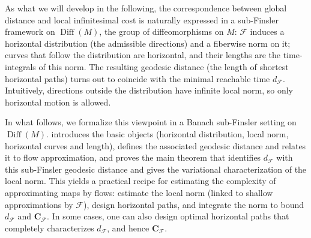 \documentclass[12pt]{amsart}
\numberwithin{equation}{section}
\theoremstyle{remark}
\newcommand{\ql}[1]{\texttt{\color{cyan} QL: \footnotesize #1}}
\begin{document}
As what we will develop in the following,
the correspondence between global distance and local infinitesimal cost is naturally expressed
in a sub-Finsler framework on $\operatorname{Diff}(M)$, the group of diffeomorphisms on $M$:
$\mathcal F$ induces a horizontal distribution (the admissible directions) and a fiberwise norm on it;
curves that follow the distribution are horizontal, and their lengths are the time-integrals of this norm.
The resulting geodesic distance (the length of shortest horizontal paths)
turns out to coincide with the minimal reachable time $d_{\mathcal F}$.
Intuitively, directions outside the distribution have infinite local norm,
so only horizontal motion is allowed.

In what follows, we formalize this viewpoint in a Banach sub-Finsler setting on $\operatorname{Diff}(M)$.
 introduces the basic objects (horizontal distribution, local norm, horizontal curves and length),
 defines the associated geodesic distance and relates it to flow approximation,
and  proves the main theorem that identifies $d_{\mathcal F}$ with this sub-Finsler geodesic distance
and gives the variational characterization of the local norm.
This yields a practical recipe for estimating the complexity of approximating maps by flows:
estimate the local norm (linked to shallow approximations by $\mathcal F$),
design horizontal paths, and integrate the norm to bound $d_{\mathcal F}$ and $\mathbf C_{\mathcal F}$.
In some cases, one can also design optimal horizontal paths that completely characterizes
$d_{\mathcal F}$, and hence $\mathbf C_{\mathcal F}$.

\end{document}
